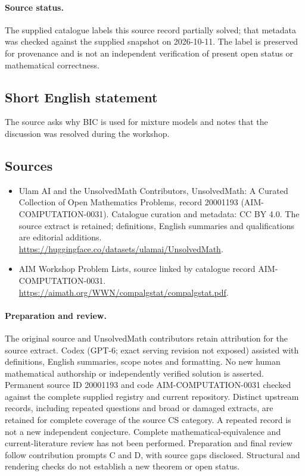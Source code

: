 \documentclass[11pt]{article}
\begin{document}
\paragraph{Source status.}
The supplied catalogue labels this source record partially solved; that metadata was checked against the supplied snapshot on 2026-10-11. The label is preserved for provenance and is not an independent verification of present open status or mathematical correctness.
\subsection{Short English statement}
The source asks why BIC is used for mixture models and notes that the discussion was resolved during the workshop.
\subsection{Sources}
\begin{itemize}
\item[\hypertarget{source:20001193:1}{S1}] Ulam AI and the UnsolvedMath Contributors, UnsolvedMath: A Curated Collection of Open Mathematics Problems, record 20001193 (AIM-COMPUTATION-0031). Catalogue curation and metadata: CC BY 4.0. The source extract is retained; definitions, English summaries and qualifications are editorial additions.
\url{https://huggingface.co/datasets/ulamai/UnsolvedMath}.
\item[\hypertarget{source:20001193:2}{S2}] AIM Workshop Problem Lists, source linked by catalogue record AIM-COMPUTATION-0031.
\url{https://aimath.org/WWN/compalgstat/compalgstat.pdf}.
\end{itemize}
\paragraph{Preparation and review.}
The original source and UnsolvedMath contributors retain attribution for the source extract. Codex (GPT-6; exact serving revision not exposed) assisted with definitions, English summaries, scope notes and formatting. No new human mathematical authorship or independently verified solution is asserted. Permanent source ID 20001193 and code AIM-COMPUTATION-0031 checked against the complete supplied registry and current repository. Distinct upstream records, including repeated questions and broad or damaged extracts, are retained for complete coverage of the source CS category. A repeated record is not a new independent conjecture. Complete mathematical-equivalence and current-literature review has not been performed. Preparation and final review follow contribution prompts C and D, with source gaps disclosed. Structural and rendering checks do not establish a new theorem or open status.
\label{end:20001193}
\end{document}

